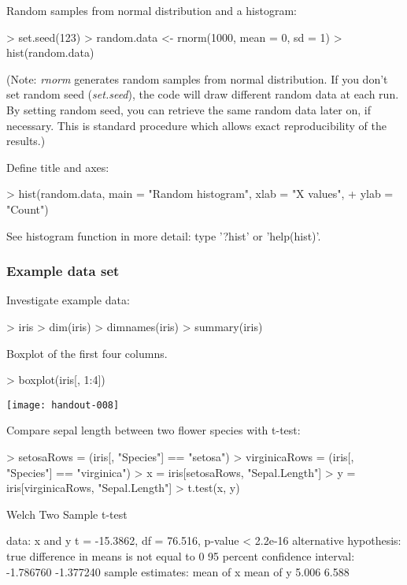 \documentclass[10pt,a4paper]{article}
\begin{document}
Random samples from normal distribution and a histogram:
\begin{Schunk}
\begin{Sinput}
> set.seed(123)
> random.data <- rnorm(1000, mean = 0, sd = 1)
> hist(random.data)
\end{Sinput}
\end{Schunk}

(Note: {\it rnorm} generates random samples from normal
distribution. If you don't set random seed ({\it set.seed}), the code
will draw different random data at each run. By setting random seed,
you can retrieve the same random data later on, if necessary. This is
standard procedure which allows exact reproducibility of the results.)


Define title and axes:
\begin{Schunk}
\begin{Sinput}
> hist(random.data, main = "Random histogram", xlab = "X values", 
+     ylab = "Count")
\end{Sinput}
\end{Schunk}

See histogram function in more detail: type '?hist' or
'help(hist)'. 

\subsubsection*{Example data set}

Investigate example data:

\begin{Schunk}
\begin{Sinput}
> iris
> dim(iris)
> dimnames(iris)
> summary(iris)
\end{Sinput}
\end{Schunk}

Boxplot of the first four columns.

\begin{Schunk}
\begin{Sinput}
> boxplot(iris[, 1:4])
\end{Sinput}
\end{Schunk}
\texttt{[image: handout-008]}

Compare sepal length between two flower species with t-test:

\begin{Schunk}
\begin{Sinput}
> setosaRows = (iris[, "Species"] == "setosa")
> virginicaRows = (iris[, "Species"] == "virginica")
> x = iris[setosaRows, "Sepal.Length"]
> y = iris[virginicaRows, "Sepal.Length"]
> t.test(x, y)
\end{Sinput}
\begin{Soutput}
	Welch Two Sample t-test

data:  x and y 
t = -15.3862, df = 76.516, p-value < 2.2e-16
alternative hypothesis: true difference in means is not equal to 0 
95 percent confidence interval:
 -1.786760 -1.377240 
sample estimates:
mean of x mean of y 
    5.006     6.588 
\end{Soutput}
\end{Schunk}
\end{document}
